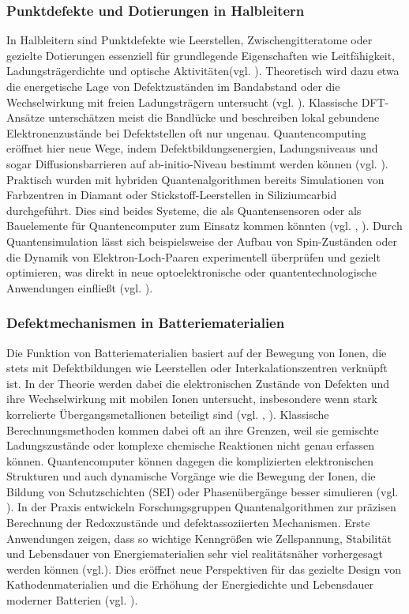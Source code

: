 {\subsubsection{Punktdefekte und Dotierungen in Halbleitern}

In Halbleitern sind Punktdefekte wie Leerstellen, Zwischengitteratome oder gezielte Dotierungen essenziell für grundlegende Eigenschaften wie Leitfähigkeit, Ladungsträgerdichte und optische Aktivitäten(vgl. \cite{bassett_quantum_2019}). Theoretisch wird dazu etwa die energetische Lage von Defektzuständen im Bandabstand oder die Wechselwirkung mit freien Ladungsträgern untersucht (vgl. \cite{freysoldt_first-principles_2014}). Klassische DFT-Ansätze unterschätzen meist die Bandlücke und beschreiben lokal gebundene Elektronenzustände bei Defektstellen oft nur ungenau. Quantencomputing eröffnet hier neue Wege, indem Defektbildungsenergien, Ladungsniveaus und sogar Diffusionsbarrieren auf ab-initio-Niveau bestimmt werden können (vgl. \cite{bassett_quantum_2019}).
Praktisch wurden mit hybriden Quantenalgorithmen bereits Simulationen von Farbzentren in Diamant oder Stickstoff-Leerstellen in Siliziumcarbid durchgeführt. Dies sind beides Systeme, die als Quantensensoren oder als Bauelemente für Quantencomputer zum Einsatz kommen könnten  (vgl. \cite{baker_simulating_2024}, \cite{cao_ab_2023}). Durch Quantensimulation lässt sich beispielsweise der Aufbau von Spin-Zuständen oder die Dynamik von Elektron-Loch-Paaren experimentell überprüfen und gezielt optimieren, was direkt in neue optoelektronische oder quantentechnologische Anwendungen einfließt (vgl. \cite{cao_ab_2023}).

\subsubsection{Defektmechanismen in Batteriematerialien}

Die Funktion von Batteriematerialien basiert auf der Bewegung von Ionen, die stets mit Defektbildungen wie Leerstellen oder Interkalationszentren verknüpft ist. In der Theorie werden dabei die elektronischen Zustände von Defekten und ihre Wechselwirkung mit mobilen Ionen untersucht, insbesondere wenn stark korrelierte Übergangsmetallionen beteiligt sind (vgl. \cite{hanaor_computational_2024}, \cite{freysoldt_first-principles_2014}). Klassische Berechnungsmethoden kommen dabei oft an ihre Grenzen, weil sie gemischte Ladungszustände oder komplexe chemische Reaktionen nicht genau erfassen können. Quantencomputer können dagegen die komplizierten elektronischen Strukturen und auch dynamische Vorgänge wie die Bewegung der Ionen, die Bildung von Schutzschichten (SEI) oder Phasenübergänge besser simulieren (vgl. \cite{urban_computational_2016}).
In der Praxis entwickeln Forschungsgruppen Quantenalgorithmen zur präzisen Berechnung der Redoxzustände und defektassoziierten Mechanismen. Erste Anwendungen zeigen, dass so wichtige Kenngrößen wie Zellspannung, Stabilität und Lebensdauer von Energiematerialien sehr viel realitätsnäher vorhergesagt werden können (vgl.\cite{baker_simulating_2024}). Dies eröffnet neue Perspektiven für das gezielte Design von Kathodenmaterialien und die Erhöhung der Energiedichte und Lebensdauer moderner Batterien (vgl. \cite{hanaor_computational_2024}).
}

